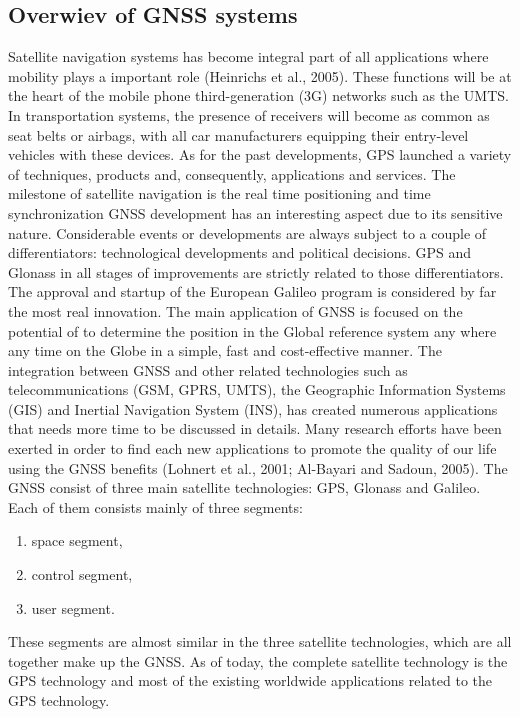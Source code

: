 \subsection{Overwiev of GNSS systems}
Satellite navigation systems has become integral part of all applications where mobility plays a
important role (Heinrichs et al., 2005). These functions will be at the heart of the mobile phone
third-generation (3G) networks such as the UMTS. In transportation systems, the presence of
receivers will become as common as seat belts or airbags, with all car manufacturers equipping
their entry-level vehicles with these devices.
As for the past developments, GPS launched a variety of techniques, products and, consequently,
applications and services. The milestone of satellite navigation is the real time positioning and
time synchronization 
GNSS development has an interesting aspect due to its sensitive nature. Considerable events or
developments are always subject to a couple of differentiators: technological developments and
political decisions.
GPS and Glonass in all stages of improvements are strictly related to those differentiators. The
approval and startup of the European Galileo program is considered by far the most real
innovation.  The main application of GNSS is focused on the potential
of to determine the position in the Global reference system any where any time on the Globe in a
simple, fast and cost-effective manner.
The integration between GNSS and other related technologies such as telecommunications
(GSM, GPRS, UMTS), the Geographic Information Systems (GIS) and Inertial Navigation
System (INS), has created numerous applications that needs more time to be discussed in details.
Many research efforts have been exerted in order to find each new applications to promote the
quality of our life using the GNSS benefits (Lohnert et al., 2001; Al-Bayari and Sadoun, 2005).
The GNSS consist of three main satellite technologies: GPS, Glonass and Galileo. Each of them
consists mainly of three segments: 
\begin{enumerate}
	\item space segment,
	\item control segment,
	\item user segment.
\end{enumerate}
These segments are almost similar in the three satellite technologies, which are all together make
up the GNSS. As of today, the complete satellite technology is the GPS technology and most of
the existing worldwide applications related to the GPS technology.

